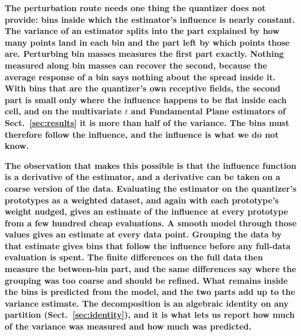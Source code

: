 \documentclass[runningheads]{llncs}
\newif\ifrev \revtrue
\newcommand{\rev}[1]{\ifrev{\color{blue}\bfseries #1}\else#1\fi}
\begin{document}
\rev{The perturbation route needs one thing the quantizer does not provide: bins inside which the estimator's influence is nearly constant. The variance of an estimator splits into the part explained by how many points land in each bin and the part left by which points those are. Perturbing bin masses measures the first part exactly. Nothing measured along bin masses can recover the second, because the average response of a bin says nothing about the spread inside it. With bins that are the quantizer's own receptive fields, the second part is small only where the influence happens to be flat inside each cell, and on the multivariate $t$ and Fundamental Plane estimators of Sect.~\ref{sec:results} it is more than half of the variance. The bins must therefore follow the influence, and the influence is what we do not know.}

\rev{The observation that makes this possible is that the influence function is a derivative of the estimator, and a derivative can be taken on a coarse version of the data. Evaluating the estimator on the quantizer's prototypes as a weighted dataset, and again with each prototype's weight nudged, gives an estimate of the influence at every prototype from a few hundred cheap evaluations. A smooth model through those values gives an estimate at every data point. Grouping the data by that estimate gives bins that follow the influence before any full-data evaluation is spent. The finite differences on the full data then measure the between-bin part, and the same differences say where the grouping was too coarse and should be refined. What remains inside the bins is predicted from the model, and the two parts add up to the variance estimate. The decomposition is an algebraic identity on any partition (Sect.~\ref{sec:identity}), and it is what lets us report how much of the variance was measured and how much was predicted.}
\end{document}
